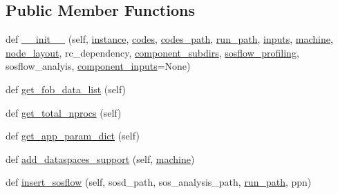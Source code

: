\subsection*{Public Member Functions}
\begin{DoxyCompactItemize}
\item 
def \hyperlink{classcodar_1_1cheetah_1_1model_1_1_run_a6b83070bbd7f8675be9f9ff7e91cadff}{\+\_\+\+\_\+init\+\_\+\+\_\+} (self, \hyperlink{classcodar_1_1cheetah_1_1model_1_1_run_af2c8be223aa9290089e020cffec6f531}{instance}, \hyperlink{classcodar_1_1cheetah_1_1model_1_1_run_a3d4ea1b22ffc7b7cecd6b7ee0e48301e}{codes}, \hyperlink{classcodar_1_1cheetah_1_1model_1_1_run_ad61ae023de5960c8bdbfd8437daafda2}{codes\+\_\+path}, \hyperlink{classcodar_1_1cheetah_1_1model_1_1_run_a33e213b156b3b22e68738ce5c0942044}{run\+\_\+path}, \hyperlink{classcodar_1_1cheetah_1_1model_1_1_run_a9b663454e66c7bd398e7f5f4bf9fcbed}{inputs}, \hyperlink{classcodar_1_1cheetah_1_1model_1_1_run_a1be34ccf48758dc37ffde2d5d2680bfa}{machine}, \hyperlink{classcodar_1_1cheetah_1_1model_1_1_run_a564be04cf0e1030d650f3ba89764e102}{node\+\_\+layout}, rc\+\_\+dependency, \hyperlink{classcodar_1_1cheetah_1_1model_1_1_run_a1d1e212876736c32d9c2bb446f79a655}{component\+\_\+subdirs}, \hyperlink{classcodar_1_1cheetah_1_1model_1_1_run_ac73191d8724dfa774f8c52df30007c11}{sosflow\+\_\+profiling}, sosflow\+\_\+analyis, \hyperlink{classcodar_1_1cheetah_1_1model_1_1_run_aef7a539e9aa216737394edbdcf0ea726}{component\+\_\+inputs}=None)
\item 
def \hyperlink{classcodar_1_1cheetah_1_1model_1_1_run_a8d10cb20808cc4c66a59f949ec40aeb8}{get\+\_\+fob\+\_\+data\+\_\+list} (self)
\item 
def \hyperlink{classcodar_1_1cheetah_1_1model_1_1_run_af56a27848d2d8b900435b462ac6b74d8}{get\+\_\+total\+\_\+nprocs} (self)
\item 
def \hyperlink{classcodar_1_1cheetah_1_1model_1_1_run_a30df1617b81f2cfcde9f57d443ca25cb}{get\+\_\+app\+\_\+param\+\_\+dict} (self)
\item 
def \hyperlink{classcodar_1_1cheetah_1_1model_1_1_run_a5fc7b380524cfda5c77104b61e4441fd}{add\+\_\+dataspaces\+\_\+support} (self, \hyperlink{classcodar_1_1cheetah_1_1model_1_1_run_a1be34ccf48758dc37ffde2d5d2680bfa}{machine})
\item 
def \hyperlink{classcodar_1_1cheetah_1_1model_1_1_run_a8f4284bf79f8b909c4c2d0ef5319e3bc}{insert\+\_\+sosflow} (self, sosd\+\_\+path, sos\+\_\+analysis\+\_\+path, \hyperlink{classcodar_1_1cheetah_1_1model_1_1_run_a33e213b156b3b22e68738ce5c0942044}{run\+\_\+path}, ppn)
\end{DoxyCompactItemize}
